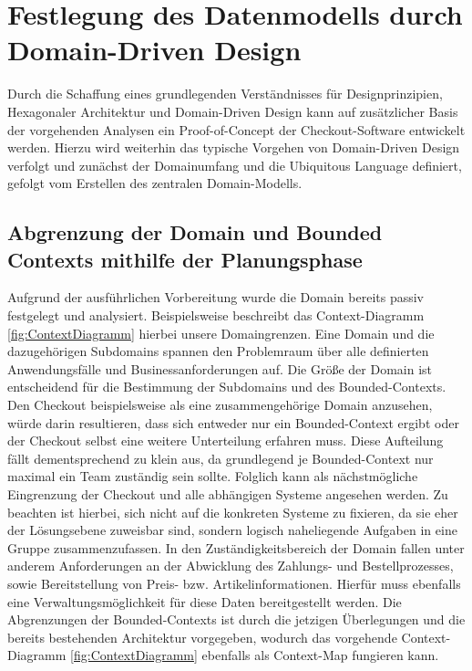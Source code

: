 

\chapter{Festlegung des Datenmodells durch Domain-Driven Design}

Durch die Schaffung eines grundlegenden Verständnisses für Designprinzipien, Hexagonaler Architektur und Domain-Driven Design kann auf zusätzlicher Basis der vorgehenden Analysen ein Proof-of-Concept der Checkout-Software entwickelt werden. Hierzu wird weiterhin das typische Vorgehen von Domain-Driven Design verfolgt und zunächst der Domainumfang und die Ubiquitous Language definiert, gefolgt vom Erstellen des zentralen Domain-Modells.

\section{Abgrenzung der Domain und Bounded Contexts mithilfe der Planungsphase}

Aufgrund der ausführlichen Vorbereitung wurde die Domain bereits passiv festgelegt und analysiert. Beispielsweise beschreibt das Context-Diagramm \ref{fig:ContextDiagramm} hierbei unsere Domaingrenzen. Eine Domain und die dazugehörigen Subdomains spannen den Problemraum über alle definierten Anwendungsfälle und Businessanforderungen auf. Die Größe der Domain ist entscheidend für die Bestimmung der Subdomains und des Bounded-Contexts. Den Checkout beispielsweise als eine zusammengehörige Domain anzusehen, würde darin resultieren, dass sich entweder nur ein Bounded-Context ergibt oder der Checkout selbst eine weitere Unterteilung erfahren muss. Diese Aufteilung fällt dementsprechend zu klein aus, da grundlegend je Bounded-Context nur maximal ein Team zuständig sein sollte. Folglich kann als nächstmögliche Eingrenzung der Checkout und alle abhängigen Systeme angesehen werden. Zu beachten ist hierbei, sich nicht auf die konkreten Systeme zu fixieren, da sie eher der Lösungsebene zuweisbar sind, sondern logisch naheliegende Aufgaben in eine Gruppe zusammenzufassen. In den Zuständigkeitsbereich der Domain fallen unter anderem Anforderungen an der Abwicklung des Zahlungs- und Bestellprozesses, sowie Bereitstellung von Preis- bzw. Artikelinformationen. Hierfür muss ebenfalls eine Verwaltungsmöglichkeit für diese Daten bereitgestellt werden. Die Abgrenzungen der Bounded-Contexts ist durch die jetzigen Überlegungen und die bereits bestehenden Architektur vorgegeben, wodurch das vorgehende Context-Diagramm \ref{fig:ContextDiagramm} ebenfalls als Context-Map fungieren kann.

